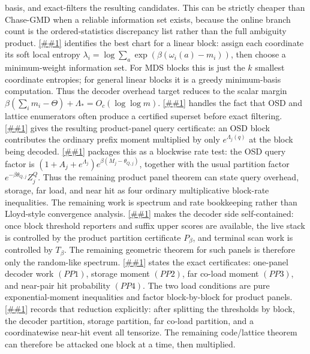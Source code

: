 \documentclass[10pt]{article}
\newcommand{\Cref}[1]{\ref{##1}}
\theoremstyle{definition}
\begin{document}
basis, and exact-filters the resulting candidates.  This can be strictly
cheaper than Chase-GMD when a reliable information set exists, because the
online branch count is the ordered-statistics discrepancy list rather than the
full ambiguity product.
\Cref{lem:min-entropy-information-set} identifies the best chart for a linear
block: assign each coordinate its soft local entropy
\(\lambda_i=\log\sum_a\exp(\beta(\omega_i(a)-m_i))\), then choose a
minimum-weight information set.  For MDS blocks this is just the \(k\) smallest
coordinate entropies; for general linear blocks it is a greedy minimum-basis
computation.  Thus the decoder overhead target reduces to the scalar margin
\(\beta(\sum_im_i-\Theta)+\Lambda_*=O_c(\log\log m)\).
\Cref{lem:superset-product-panel-decoder} handles the fact that OSD and lattice
enumerators often produce a certified superset before exact filtering.
\Cref{cor:osd-superset-block-reporter} gives the resulting product-panel query
certificate: an OSD block contributes the ordinary prefix moment multiplied by
only \(e^{\Lambda_j(q)}\) at the block being decoded.
\Cref{cor:superset-product-panel-rate-bookkeeping} packages this as a
blockwise rate test: the OSD query factor is
\((1+A_j+e^{\Lambda_j})e^{\beta(M_j-\theta_{Q,j})}\), together with the usual
partition factor \(e^{-\beta\theta_{Q,j}}Z_j^Q\).  Thus the remaining product
panel theorem can state query overhead, storage, far load, and near hit as four
ordinary multiplicative block-rate inequalities.
The remaining work is spectrum and rate bookkeeping rather than Lloyd-style
convergence analysis.
\Cref{lem:additive-product-panel-decoder}
makes the decoder side self-contained: once block threshold reporters and
suffix upper scores are available, the live stack is controlled by the product
partition certificate \(P_\beta\), and terminal scan work is controlled by
\(T_\beta\).  The remaining geometric theorem for such panels is therefore
only the random-like spectrum.  \Cref{prop:product-panel-spectrum-compiler}
states the exact certificates: one-panel decoder work \((PP1)\), storage
moment \((PP2)\), far co-load moment \((PP3)\), and near-pair hit probability
\((PP4)\).  The two load conditions are pure exponential-moment inequalities
and factor block-by-block for product panels.
\Cref{lem:product-panel-tensorization} records that reduction explicitly:
after splitting the thresholds by block, the decoder partition, storage
partition, far co-load partition, and a coordinatewise near-hit event all
tensorize.  The remaining code/lattice theorem can therefore be attacked one
block at a time, then multiplied.
\end{document}

